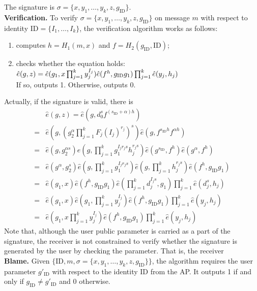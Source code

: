 \documentclass[times]{secauth}
\theoremstyle{definition}
\theoremstyle{remark}
\begin{document}
\par
The signature is $\sigma = \{x, y_1, \ldots, y_k, z, g_{\mathrm{ID}}\}$.
\vspace{0.2cm}
\\
\textbf{Verification.} To verify $\sigma = \{x, y_1, \ldots, y_k, z, g_{\mathrm{ID}}\}$ on message $m$ with respect to identity $\mathrm{ID} = \{I_1, \ldots, I_k\}$, the verification algorithm works as follows:
\begin{enumerate}
\item computes $h = H_1(m, x)$ and $f = H_2(g_\mathrm{ID}, \mathrm{ID})$;
\item checks whether the equation holds:
$\hat{e}(g, z) \\= \hat{e}(g_1, x\prod_{j=1}^k y_j^{I_j})\hat{e}(f^h, g_\mathrm{ID}g_1)\prod_{j=1}^k \hat{e}(y_j, h_j)$\\
If so, outputs 1. Otherwise, outputs 0.
\end{enumerate}
\par
Actually, if the signature is valid, there is 
\begin{align*}
&\hat{e}(g, z) = \hat{e}(g, d_0^{s} f^{(s_\mathrm{ID}+\alpha)h})\\
= &\hat{e}(g, (g_2^\alpha \prod^k_{j=1} F_j(I_j)^{r_j})^{s}) \hat{e}(g, f^{s_\mathrm{ID}h}f^{\alpha h})\\
= &\hat{e}(g, g_2^{\alpha s}) \hat{e}(g, \prod^k_{j=1} g_1^{I_jr_js} h_j^{r_js}) \hat{e}(g^{s_\mathrm{ID}}, f^h) \hat{e}(g^\alpha, f^h)\\
= &\hat{e}(g^\alpha, g_2^s) \hat{e}(g, \prod^k_{j=1} g_1^{I_jr_js}) \hat{e}(g, \prod^k_{j=1}  h_j^{r_js}) \hat{e}(f^h, g_\mathrm{ID}g_1)\\
= &\hat{e}(g_1, x) \hat{e}(f^h, g_\mathrm{ID}g_1) \hat{e}(\prod^k_{j=1}d_j^{I_js}, g_1) \prod^k_{j=1}\hat{e}(d_j^{s}, h_j)\\
= &\hat{e}(g_1, x) \hat{e}(g_1, \prod^k_{j=1} y_j^{I_j}) \hat{e}(f^h, g_\mathrm{ID}g_1) \prod^k_{j=1}\hat{e}(y_j, h_j)\\
= &\hat{e}(g_1, x\prod_{j=1}^k y_j^{I_j})\hat{e}(f^h, g_\mathrm{ID}g_1)\prod_{j=1}^k \hat{e}(y_j, h_j)
\end{align*}
Note that, although the user public parameter is carried as a part of the signature, the receiver is not constrained to verify whether the signature is generated by the user by checking the parameter. 
That is, the receiver 
\vspace{0.2cm}
\\
\textbf{Blame.} 
Given $\{\mathrm{ID}, m, \sigma = \{x, y_1, \ldots, y_k, z, g_{\mathrm{ID}}\}\}$, the algorithm requires the user parameter $g'_{\mathrm{ID}}$ with respect to the identity ID from the AP. 
It outputs 1 if and only if $g_{\mathrm{ID}} \neq g'_{\mathrm{ID}}$ and 0 otherwise.
\end{document}
